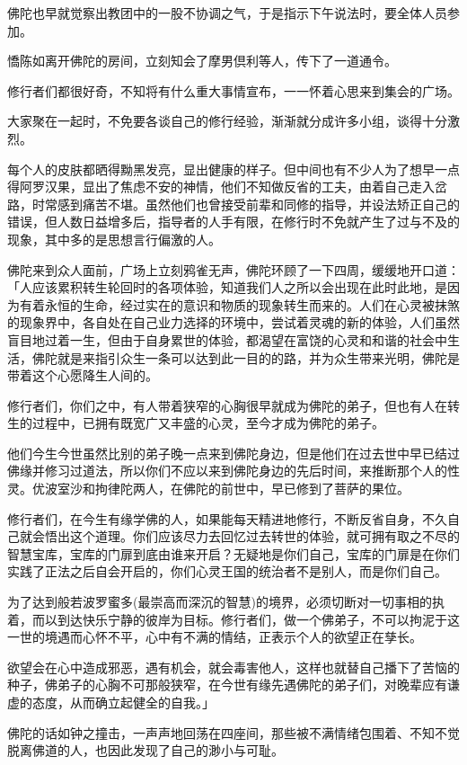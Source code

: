 \documentclass[twoside,openany]{book}
\begin{document}
佛陀也早就觉察出教团中的一股不协调之气，于是指示下午说法时，要全体人员参加。

憍陈如离开佛陀的房间，立刻知会了摩男倶利等人，传下了一道通令。

修行者们都很好奇，不知将有什么重大事情宣布，一一怀着心思来到集会的广场。

大家聚在一起时，不免要各谈自己的修行经验，渐渐就分成许多小组，谈得十分激烈。

每个人的皮肤都晒得黝黑发亮，显出健康的样子。但中间也有不少人为了想早一点得阿罗汉果，显出了焦虑不安的神情，他们不知做反省的工夫，由着自己走入岔路，时常感到痛苦不堪。虽然他们也曾接受前辈和同修的指导，并设法矫正自己的错误，但人数日益增多后，指导者的人手有限，在修行时不免就产生了过与不及的现象，其中多的是思想言行偏激的人。

佛陀来到众人面前，广场上立刻鸦雀无声，佛陀环顾了一下四周，缓缓地开口道：「人应该累积转生轮回时的各项体验，知道我们人之所以会出现在此时此地，是因为有着永恒的生命，经过实在的意识和物质的现象转生而来的。人们在心灵被抹煞的现象界中，各自处在自己业力选择的环境中，尝试着灵魂的新的体验，人们虽然盲目地过着一生，但由于自身累世的体验，都渴望在富饶的心灵和和谐的社会中生活，佛陀就是来指引众生一条可以达到此一目的的路，并为众生带来光明，佛陀是带着这个心愿降生人间的。

修行者们，你们之中，有人带着狭窄的心胸很早就成为佛陀的弟子，但也有人在转生的过程中，已拥有既宽广又丰盛的心灵，至今才成为佛陀的弟子。

他们今生今世虽然比别的弟子晚一点来到佛陀身边，但是他们在过去世中早已结过佛缘并修习过道法，所以你们不应以来到佛陀身边的先后时间，来推断那个人的性灵。优波室沙和拘律陀两人，在佛陀的前世中，早已修到了菩萨的果位。

修行者们，在今生有缘学佛的人，如果能每天精进地修行，不断反省自身，不久自己就会悟出这个道理。你们应该尽力去回忆过去转世的体验，就可拥有取之不尽的智慧宝库，宝库的门扉到底由谁来开启？无疑地是你们自己，宝库的门扉是在你们实践了正法之后自会开启的，你们心灵王国的统治者不是别人，而是你们自己。

为了达到般若波罗蜜多(最崇高而深沉的智慧)的境界，必须切断对一切事相的执着，而以到达快乐宁静的彼岸为目标。修行者们，做一个佛弟子，不可以拘泥于这一世的境遇而心怀不平，心中有不满的情结，正表示个人的欲望正在孳长。

欲望会在心中造成邪恶，遇有机会，就会毒害他人，这样也就替自己播下了苦恼的种子，佛弟子的心胸不可那般狭窄，在今世有缘先遇佛陀的弟子们，对晚辈应有谦虚的态度，从而确立起健全的自我。」

佛陀的话如钟之撞击，一声声地回荡在四座间，那些被不满情绪包围着、不知不觉脱离佛道的人，也因此发现了自己的渺小与可耻。
\end{document}
